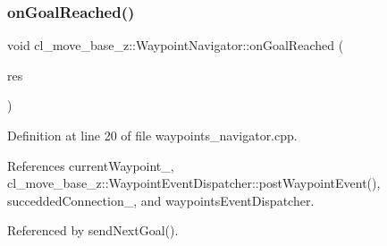 \subsubsection{\texorpdfstring{on\+Goal\+Reached()}{onGoalReached()}}
{\footnotesize\ttfamily void cl\+\_\+move\+\_\+base\+\_\+z\+::\+Waypoint\+Navigator\+::on\+Goal\+Reached (\begin{DoxyParamCaption}\item[{\hyperlink{classcl__move__base__z_1_1ClMoveBaseZ_a99373d0c15ae96684462d8677f5fd632}{Cl\+Move\+Base\+Z\+::\+Result\+Const\+Ptr} \&}]{res }\end{DoxyParamCaption})\hspace{0.3cm}{\ttfamily [private]}}



Definition at line 20 of file waypoints\+\_\+navigator.\+cpp.



References current\+Waypoint\+\_\+, cl\+\_\+move\+\_\+base\+\_\+z\+::\+Waypoint\+Event\+Dispatcher\+::post\+Waypoint\+Event(), succedded\+Connection\+\_\+, and waypoints\+Event\+Dispatcher.



Referenced by send\+Next\+Goal().


